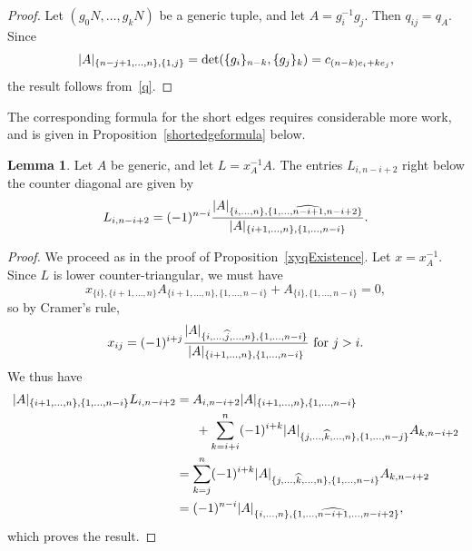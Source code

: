\documentclass[11pt]{amsart}
\theoremstyle{definition}
\newtheorem{lemma}[theorem]{Lemma}
\numberwithin{equation}{section}
\def\printname#1{
        \if\draft y
                \smash{\makebox[0pt]{\hspace{-0.5in}
                        \raisebox{8pt}{\tt\tiny #1}}}
        \fi
}
\def\lbl#1{\label{#1}\printname{#1}}
\DeclarePairedDelimiter{\Norm}{\lvert}{\rvert}
\begin{document}
\begin{proof} 
Let $(g_0N,\dots,g_kN)$ be a generic tuple, and let $A=g_i^{-1}g_j$. 
Then $q_{ij}=q_A$. Since 
\begin{equation}
\Norm{A}_{\{n-j+1,\dots,n\},\{1,j\}}=\det(\{g_i\}_{n-k},\{g_j\}_k)=c_{(n-k)e_i+ke_j},
\end{equation} 
the result follows from~\eqref{q}.
\end{proof}

The corresponding formula for the short edges requires considerable more work, and is given in Proposition~\ref{shortedgeformula} below. %

\begin{lemma} 
Let $A$ be generic, and let $L=x_A^{-1}A$.
The entries $L_{i,n-i+2}$ right below the counter diagonal are given by
\begin{equation}\lbl{belowcounterdiag}L_{i,n-i+2}=(-1)^{n-i}\frac{\Norm{A}_{\{i,\dots,n\},\{1,\dots,\widehat{n-i+1},n-i+2\}}}{\Norm{A}_{\{i+1,\dots,n\},\{1,\dots,n-i\}}}.
\end{equation}
\end{lemma}

\begin{proof}
We proceed as in the proof of Proposition~\ref{xyqExistence}. Let $x=x_A^{-1}$. Since $L$ is lower counter-triangular, we must have
\begin{equation}
x_{\{i\},\{i+1,\dots,n\}}A_{\{i+1,\dots,n\},\{1,\dots,n-i\}}+A_{\{i\},\{1,\dots,n-i\}}=0,
\end{equation}
so by Cramer's rule,
\begin{equation}
x_{ij}=(-1)^{i+j}\frac{\Norm{A}_{\{i,\dots,\widehat j,\dots,n\},\{1,\dots,n-i\}}}{\Norm{A}_{\{i+1,\dots,n\},\{1,\dots,n-i\}}}\text{ for }j>i.
\end{equation}
We thus have
\begin{align*}
\Norm{A}_{\{i+1,\dots,n\},\{1,\dots,n-i\}}L_{i,n-i+2}&=A_{i,n-i+2}\Norm{A}_{\{i+1,\dots,n\},\{1,\dots,n-i\}}\\&\hphantom{==}+\sum_{k=i+i}^n(-1)^{i+k}\Norm{A}_{\{j,\dots,\widehat k,\dots,n\},\{1,\dots,n-j\}}A_{k,n-i+2}\\&=\sum_{k=j}^n(-1)^{i+k}\Norm{A}_{\{j,\dots,\widehat k,\dots,n\},\{1,\dots,n-i\}}A_{k,n-i+2}\\&=(-1)^{n-i}\Norm{A}_{\{i,\dots,n\},\{1,\dots,\widehat{n-i+1},\dots,n-i+2\}},
\end{align*}
which proves the result.
\end{proof}
\end{document}
